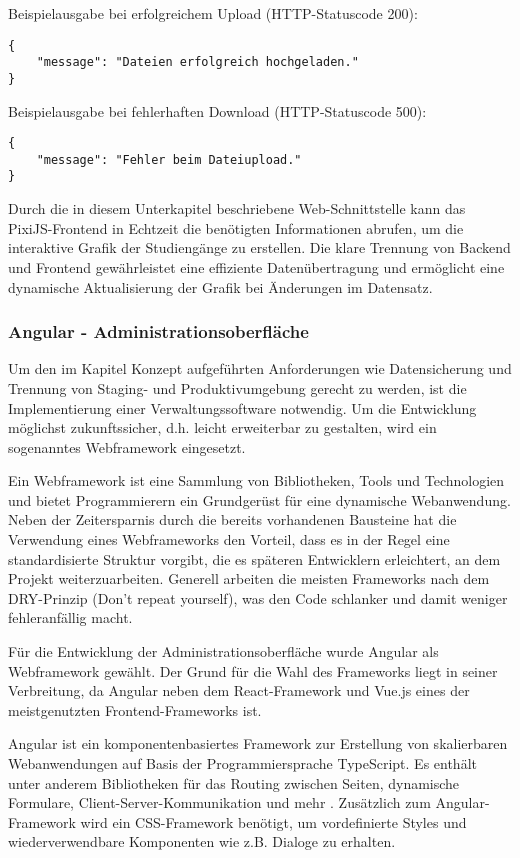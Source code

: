 \noindent
Beispielausgabe bei erfolgreichem Upload (HTTP-Statuscode 200):
\begin{lstlisting}[style=Python]
{
    "message": "Dateien erfolgreich hochgeladen."
}
\end{lstlisting}

\noindent
Beispielausgabe bei fehlerhaften Download (HTTP-Statuscode 500):
\begin{lstlisting}[style=Python]
{
    "message": "Fehler beim Dateiupload."
}
\end{lstlisting}

Durch die in diesem Unterkapitel beschriebene Web-Schnittstelle kann das PixiJS-Frontend in Echtzeit die benötigten Informationen abrufen, um die interaktive Grafik der Studiengänge zu erstellen. Die klare Trennung von Backend und Frontend gewährleistet eine effiziente Datenübertragung und ermöglicht eine dynamische Aktualisierung der Grafik bei Änderungen im Datensatz.

\subsubsection{Angular - Administrationsoberfläche}
Um den im Kapitel Konzept aufgeführten Anforderungen wie Datensicherung und Trennung von Staging- und Produktivumgebung gerecht zu werden, ist die Implementierung einer Verwaltungssoftware notwendig. Um die Entwicklung möglichst zukunftssicher, d.h. leicht erweiterbar zu gestalten, wird ein sogenanntes Webframework eingesetzt.

Ein Webframework ist eine Sammlung von Bibliotheken, Tools und Technologien und bietet Programmierern ein Grundgerüst für eine dynamische Webanwendung. Neben der Zeitersparnis durch die bereits vorhandenen Bausteine hat die Verwendung eines Webframeworks den Vorteil, dass es in der Regel eine standardisierte Struktur vorgibt, die es späteren Entwicklern erleichtert, an dem Projekt weiterzuarbeiten. Generell arbeiten die meisten Frameworks nach dem DRY-Prinzip (Don't repeat yourself), was den Code schlanker und damit weniger fehleranfällig macht.
\parencite{domainfactory_beliebtesten_2023}

Für die Entwicklung der Administrationsoberfläche wurde Angular als Webframework gewählt. Der Grund für die Wahl des Frameworks liegt in seiner Verbreitung, da Angular neben dem React-Framework und Vue.js eines der meistgenutzten Frontend-Frameworks ist. \parencite{greif_state_2022}

Angular ist ein komponentenbasiertes Framework zur Erstellung von skalierbaren Webanwendungen auf Basis der Programmiersprache TypeScript. Es enthält unter anderem Bibliotheken für das Routing zwischen Seiten, dynamische Formulare, Client-Server-Kommunikation und mehr \parencite{google_inc_angular_2023}. Zusätzlich zum Angular-Framework wird ein CSS-Framework benötigt, um vordefinierte Styles und wiederverwendbare Komponenten wie z.B. Dialoge zu erhalten.


